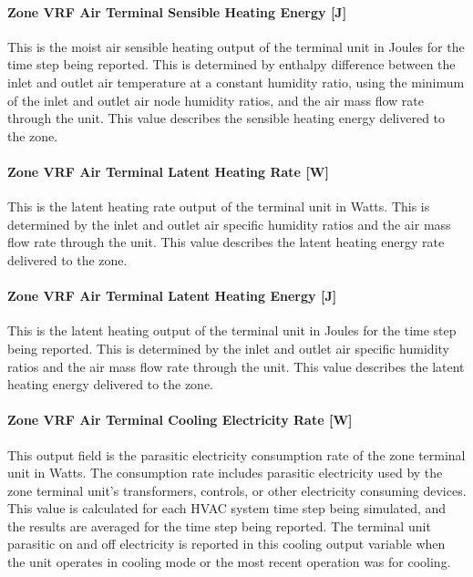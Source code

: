 \paragraph{Zone VRF Air Terminal Sensible Heating Energy {[}J{]}}\label{zone-vrf-air-terminal-sensible-heating-energy-j}

This is the moist air sensible heating output of the terminal unit in Joules for the time step being reported. This is determined by enthalpy difference between the inlet and outlet air temperature at a constant humidity ratio, using the minimum of the inlet and outlet air node humidity ratios, and the air mass flow rate through the unit. This value describes the sensible heating energy delivered to the zone.

\paragraph{Zone VRF Air Terminal Latent Heating Rate {[}W{]}}\label{zone-vrf-air-terminal-latent-heating-rate-w}

This is the latent heating rate output of the terminal unit in Watts. This is determined by the inlet and outlet air specific humidity ratios and the air mass flow rate through the unit. This value describes the latent heating energy rate delivered to the zone.

\paragraph{Zone VRF Air Terminal Latent Heating Energy {[}J{]}}\label{zone-vrf-air-terminal-latent-heating-energy-j}

This is the latent heating output of the terminal unit in Joules for the time step being reported. This is determined by the inlet and outlet air specific humidity ratios and the air mass flow rate through the unit. This value describes the latent heating energy delivered to the zone.

\paragraph{Zone VRF Air Terminal Cooling Electricity Rate {[}W{]}}\label{zone-vrf-air-terminal-cooling-electric-powerw}

This output field is the parasitic electricity consumption rate of the zone terminal unit in Watts. The consumption rate includes parasitic electricity used by the zone terminal unit's transformers, controls, or other electricity consuming devices. This value is calculated for each HVAC system time step being simulated, and the results are averaged for the time step being reported. The terminal unit parasitic on and off electricity is reported in this cooling output variable when the unit operates in cooling mode or the most recent operation was for cooling.

